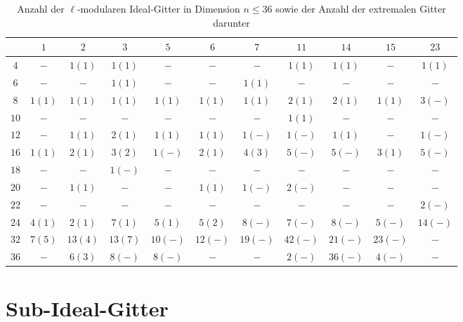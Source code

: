 \documentclass[12pt,a4paper,halfparskip,headsepline,bibtotocnumbered]{scrreprt}
\theoremstyle{nummermitklammern}
\theoremstyle{nonumberbreak}
\begin{document}
\begin{table}\label{tab:numidlat}
	\centering
	\begin{tabular}{|c||c|c|c|c|c|c|c|c|c|c|}
		\hline
		\backslashbox{$n$}{$\ell$}	&$1$	&$2$	&$3$	&$5$	&$6$	&$7$	&$11$	&$14$	&$15$	&$23$\\ \hline \hline
		$4$		&$-$		&$1(1)$		&$1(1)$		&$-$		&$-$		&$-$		&$1(1)$		&$1(1)$		&$-$		&$1(1)$ \\ \hline
		$6$		&$-$		&$-$		&$1(1)$		&$-$		&$-$		&$1(1)$		&$-$		&$-$		&$-$		&$-$ \\ \hline
		$8$		&$1(1)$		&$1(1)$		&$1(1)$		&$1(1)$		&$1(1)$		&$1(1)$		&$2(1)$		&$2(1)$		&$1(1)$		&$3(-)$ \\ \hline
		$10$	&$-$		&$-$		&$-$		&$-$		&$-$		&$-$		&$1(1)$		&$-$		&$-$		&$-$ \\ \hline
		$12$	&$-$		&$1(1)$		&$2(1)$		&$1(1)$		&$1(1)$		&$1(-)$		&$1(-)$		&$1(1)$		&$-$		&$1(-)$ \\ \hline
		$16$	&$1(1)$		&$2(1)$		&$3(2)$		&$1(-)$		&$2(1)$		&$4(3)$		&$5(-)$		&$5(-)$		&$3(1)$		&$5(-)$ \\ \hline
		$18$	&$-$		&$-$		&$1(-)$		&$-$		&$-$		&$-$		&$-$		&$-$		&$-$		&$-$ \\ \hline
		$20$	&$-$		&$1(1)$		&$-$		&$-$		&$1(1)$		&$1(-)$		&$2(-)$		&$-$		&$-$		&$-$ \\ \hline
		$22$	&$-$		&$-$		&$-$		&$-$		&$-$		&$-$		&$-$		&$-$		&$-$		&$2(-)$ \\ \hline
		$24$	&$4(1)$		&$2(1)$		&$7(1)$		&$5(1)$		&$5(2)$		&$8(-)$		&$7(-)$		&$8(-)$		&$5(-)$		&$14(-)$ \\ \hline
		$32$	&$7(5)$		&$13(4)$	&$13(7)$	&$10(-)$	&$12(-)$	&$19(-)$	&$42(-)$	&$21(-)$	&$23(-)$	&$-$ \\ \hline
		$36$	&$-$		&$6(3)$		&$8(-)$		&$8(-)$		&$-$		&$-$		&$2(-)$		&$36(-)$	&$4(-)$		&$-$ \\ \hline
	\end{tabular}
	\caption{Anzahl der $\ell$-modularen Ideal-Gitter in Dimension $n \leq 36$ sowie der Anzahl der extremalen Gitter darunter}
\end{table}

\chapter{Sub-Ideal-Gitter}
\end{document}
